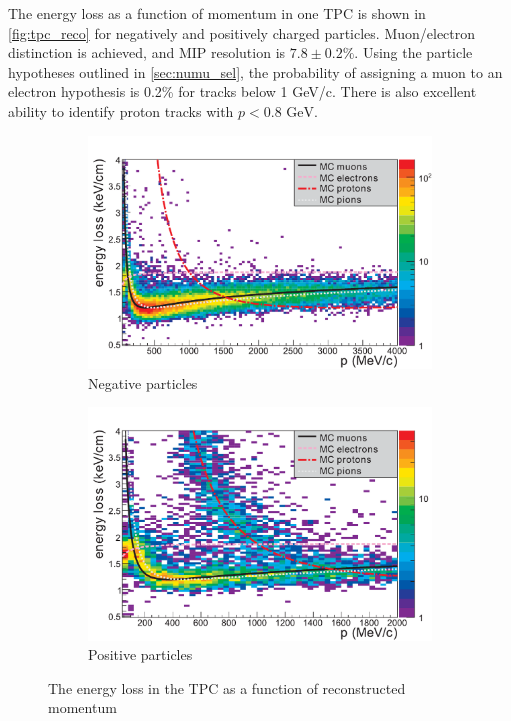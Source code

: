 The energy loss as a function of momentum in one TPC is shown in \autoref{fig:tpc_reco} for negatively and positively charged particles. Muon/electron distinction is achieved, and MIP resolution is $7.8\pm0.2\%$. Using the particle hypotheses outlined in \autoref{sec:numu_sel}, the probability of assigning a muon to an electron hypothesis is 0.2\% for tracks below 1 GeV/c\cite{thesis_tpc}. There is also excellent ability to identify proton tracks with $p < 0.8 \text{ GeV}$.
\begin{figure}[h]
	\begin{subfigure}[t]{0.47\textwidth}
		\includegraphics[width=\textwidth, trim={0mm 0mm 0mm 0mm}, clip,page=1]{figures/numu/TPC_PID_neg}
		\caption{Negative particles}
	\end{subfigure}
	\begin{subfigure}[t]{0.47\textwidth}
		\includegraphics[width=\textwidth, trim={0mm 0mm 0mm 0mm}, clip,page=1]{figures/numu/TPC_PID_pos}
		\caption{Positive particles}
	\end{subfigure}	
	\caption{The energy loss in the TPC as a function of reconstructed momentum}
	\label{fig:tpc_reco}
\end{figure}

